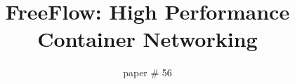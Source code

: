 \documentclass{cls/hotnets16}
\begin{document}
\title{FreeFlow: High Performance Container Networking}

\author{paper \# 56}

\date{}


\maketitle
\thispagestyle{empty}












\end{document}

